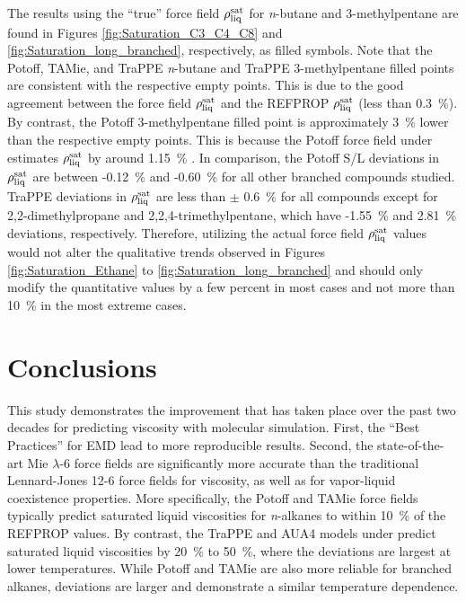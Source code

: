 \documentclass[preprint,review,12pt]{elsarticle}
\begin{document}
	The results using the ``true'' force field $\rho_{\rm liq}^{\rm sat}$ for \textit{n}-butane and 3-methylpentane are found in Figures \ref{fig:Saturation_C3_C4_C8} and \ref{fig:Saturation_long_branched}, respectively, as filled symbols. Note that the Potoff, TAMie, and TraPPE \textit{n}-butane and TraPPE 3-methylpentane filled points are consistent with the respective empty points. This is due to the good agreement between the force field $\rho_{\rm liq}^{\rm sat}$ and the REFPROP $\rho_{\rm liq}^{\rm sat}$ (less than 0.3~\%). By contrast, the Potoff 3-methylpentane filled point is approximately 3~\% lower than the respective empty points. This is because the Potoff force field under estimates $\rho_{\rm liq}^{\rm sat}$ by around 1.15~\% \cite{Potoff_branched}. In comparison, the Potoff S/L deviations in $\rho_{\rm liq}^{\rm sat}$ are between -0.12~\% and -0.60~\% for all other branched compounds studied. TraPPE deviations in $\rho_{\rm liq}^{\rm sat}$ are less than $\pm$ 0.6~\% for all compounds except for 2,2-dimethylpropane and 2,2,4-trimethylpentane, which have -1.55~\% and 2.81~\% deviations, respectively. Therefore, utilizing the actual force field $\rho_{\rm liq}^{\rm sat}$ values would not alter the qualitative trends observed in Figures \ref{fig:Saturation_Ethane} to \ref{fig:Saturation_long_branched} and should only modify the quantitative values by a few percent in most cases and not more than 10~\% in the most extreme cases.     
	
	
	\section{Conclusions} \label{Conclusions}
	
	This study demonstrates the improvement that has taken place over the past two decades for predicting viscosity with molecular simulation. First, the ``Best Practices'' for EMD lead to more reproducible results. Second, the state-of-the-art Mie $\lambda$-6 force fields are significantly more accurate than the traditional Lennard-Jones 12-6 force fields for viscosity, as well as for vapor-liquid coexistence properties. More specifically, the Potoff and TAMie force fields typically predict saturated liquid viscosities for \textit{n}-alkanes to within 10~\% of the REFPROP values. By contrast, the TraPPE and AUA4 models under predict saturated liquid viscosities by 20~\% to 50~\%, where the deviations are largest at lower temperatures. While Potoff and TAMie are also more reliable for branched alkanes, deviations are larger and demonstrate a similar temperature dependence. 
	
\end{document}
